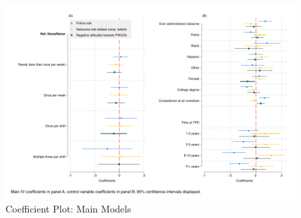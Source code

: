 


\begin{landscape}
 
\end{landscape}




\begin{figure}
    \centering
    \caption{\centering Coefficient Plot: Main Models}
    \includegraphics{figures/coefplot-combined.pdf}
\end{figure}